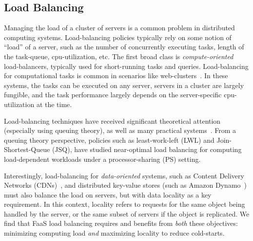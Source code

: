\subsection{Load Balancing}

Managing the load of a cluster of servers is a common problem in distributed computing systems.
Load-balancing policies typically rely on some notion of ``load'' of a server, such as the number of concurrently executing tasks, length of the task-queue, cpu-utilization, etc.
%
The first broad class is \emph{compute-oriented} load-balancers, typically used for short-running tasks and queries. 
Load-balancing for computational tasks is common in scenarios like web-clusters~\cite{karger1999web}. 
In these systems, the tasks can be executed on any server,  servers in a cluster are largely fungible, and the task performance largely depends on the server-specific cpu-utilization at the time.

Load-balancing techniques have received significant theoretical attention (especially using queuing theory), as well as many practical systems~\cite{decandia2007dynamo}. 
From a queuing theory perspective, policies such as least-work-left (LWL) and Join-Shortest-Queue (JSQ), have studied near-optimal load balancing for computing load-dependent workloads under a processor-sharing (PS) setting. 

Interestingly, load-balancing for \emph{data-oriented} systems, such as Content Delivery Networks (CDNs)~\cite{nygren2010akamai}, and distributed key-value stores (such as Amazon Dynamo~\cite{decandia2007dynamo}) must also balance the load on servers, but with data locality as a key requirement.
In this context, locality refers to requests for the same object being handled by the server, or the same subset of servers if the object is replicated. 
We find that FaaS load balancing requires and benefits from \emph{both} these objectives: minimizing computing load \emph{and} maximizing locality to reduce cold-starts. 

